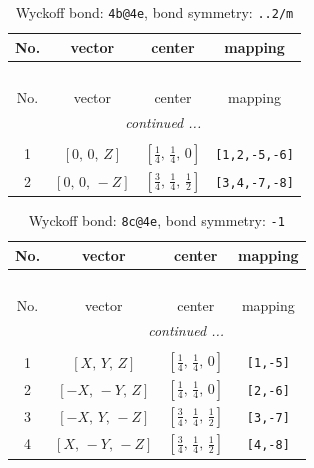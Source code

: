 \documentclass[fleqn,8pt]{jsarticle}
\begin{document}
\renewcommand{\arraystretch}{1.2}
\begin{longtable}{cccc}
\caption{Wyckoff bond: {\tt 4b@4e}, bond symmetry: {\tt ..2/m}}
 \\
 \hline \hline
No. & vector & center & mapping \\ \hline \endfirsthead

\multicolumn{3}{l}{\tablename\ \thetable{}} \\
 \hline \hline
No. & vector & center & mapping \\ \hline \endhead

 \hline \hline
\multicolumn{3}{r}{\footnotesize\it continued ...} \\ \endfoot

 \hline \hline
\multicolumn{3}{r}{} \\ \endlastfoot

1 & $\left[ 0,\, 0,\, Z \right]$ & $\left[ \frac{1}{4},\, \frac{1}{4},\, 0 \right]$ & {\tt [1,2,-5,-6]} \\ \hline
2 & $\left[ 0,\, 0,\, - Z \right]$ & $\left[ \frac{3}{4},\, \frac{1}{4},\, \frac{1}{2} \right]$ & {\tt [3,4,-7,-8]} \\
\end{longtable}
\renewcommand{\arraystretch}{1.2}
\begin{longtable}{cccc}
\caption{Wyckoff bond: {\tt 8c@4e}, bond symmetry: {\tt -1}}
 \\
 \hline \hline
No. & vector & center & mapping \\ \hline \endfirsthead

\multicolumn{3}{l}{\tablename\ \thetable{}} \\
 \hline \hline
No. & vector & center & mapping \\ \hline \endhead

 \hline \hline
\multicolumn{3}{r}{\footnotesize\it continued ...} \\ \endfoot

 \hline \hline
\multicolumn{3}{r}{} \\ \endlastfoot

1 & $\left[ X,\, Y,\, Z \right]$ & $\left[ \frac{1}{4},\, \frac{1}{4},\, 0 \right]$ & {\tt [1,-5]} \\ \hline
2 & $\left[ - X,\, - Y,\, Z \right]$ & $\left[ \frac{1}{4},\, \frac{1}{4},\, 0 \right]$ & {\tt [2,-6]} \\ \hline
3 & $\left[ - X,\, Y,\, - Z \right]$ & $\left[ \frac{3}{4},\, \frac{1}{4},\, \frac{1}{2} \right]$ & {\tt [3,-7]} \\ \hline
4 & $\left[ X,\, - Y,\, - Z \right]$ & $\left[ \frac{3}{4},\, \frac{1}{4},\, \frac{1}{2} \right]$ & {\tt [4,-8]} \\
\end{longtable}
\end{document}
